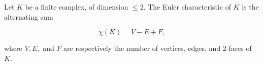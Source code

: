Let $K$ be a finite complex, of dimension $\leqslant 2$. The Euler characteristic of $K$ is the alternating sum

$$\chi(K) = V - E + F,$$

where $V, E,$ and $F$ are respectively the number of vertices, edges, and 2-faces of $K$.
